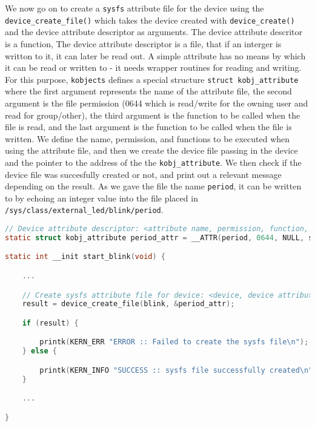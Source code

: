 \documentclass[a4paper,oneside,onecolumn]{article}
\newcommand{\code}[1]{\colorbox{codegray}{\texttt{#1}}}
\begin{document}
We now go on to create a \texttt{sysfs} attribute file for the device using the \code{device\_create\_file()} which takes the device created with \code{device\_create()} and the device attribute descriptor as arguments. The device attribute descritor is a function, The device attribute descriptor is a file, that if an interger is writton to it, it can later be read out. A simple attribute has no means by which it can be read or written to - it needs wrapper routines for reading and writing. For this purpose, \texttt{kobjects} defines a special structure \code{struct kobj\_attribute} where the first argument represents the name of the attribute file, the second argument is the file permission (0644 which is read/write for the owning user and read for group/other), the third argument is the function to be called when the file is read, and the last argument is the function to be called when the file is written.
\newline
\newline
We define the name, permission, and functions to be executed when using the attribute file, and then we create the device file passing in the device and the pointer to the address of the the \code{kobj\_attribute}. We then check if the device file was succesfully created or not, and print out a relevant message depending on the result.
\newline
As we gave the file the name \texttt{period}, it can be written to by echoing an integer value into the file placed in \texttt{/sys/class/external\_led/blink/period}.

\begin{lstlisting}[language=c, label={lst:sysfs}, caption={Creating a \texttt{sysfs} attribute file}]
// Device attribute descriptor: <attribute name, permission, function, function>
static struct kobj_attribute period_attr = __ATTR(period, 0644, NULL, store_period);

static int __init start_blink(void) {

    ...

    // Create sysfs attribute file for device: <device, device attribute descriptor>
    result = device_create_file(blink, &period_attr);

    if (result) {

        printk(KERN_ERR "ERROR :: Failed to create the sysfs file\n");
    } else {

        printk(KERN_INFO "SUCCESS :: sysfs file successfully created\n");
    }

    ...

}
\end{lstlisting}
\end{document}

